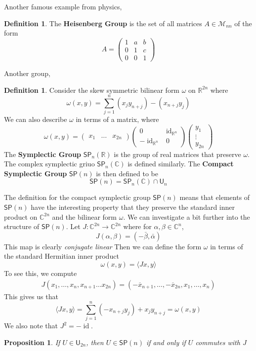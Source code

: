 \documentclass[psamsfonts]{amsart}
\newtheorem{prop}[thm]{Proposition}
\theoremstyle{definition}
\newtheorem{defn}[thm]{Definition}
\theoremstyle{remark}
\newcommand{\R}{\mathbb{R}}
\newcommand{\C}{\mathbb{C}}
\newcommand{\SP}{\mathsf{SP}}
\DeclareMathOperator{\id}{id}
\begin{document}
Another famous example from physics,
\begin{defn}
The \textbf{Heisenberg Group} is the set of all matrices $A \in \mathcal{M}_{nn}$ of the form
$$A = \begin{pmatrix}
1 & a & b \\
0 & 1 & c \\
0 & 0 & 1
\end{pmatrix} $$
\end{defn}

Another group,
\begin{defn}
Consider the skew symmetric bilinear form $\omega$ on $\R^{2n}$ where
$$\omega(x,y) = \sum_{j = 1}^n (x_jy_{n+j}) - (x_{n+j}y_{j}) $$
We can also describe $\omega$ in terms of a matrix, where
$$\omega(x,y) = \begin{pmatrix}
x_1 & \ldots  & x_{2n}
\end{pmatrix} \begin{pmatrix}
0 & \id_{\R^n} \\
-\id_{\R^n} & 0
\end{pmatrix} \begin{pmatrix}
y_1 \\
\vdots \\
y_{2n}
\end{pmatrix}$$
The \textbf{Symplectic Group} $\SP_n(\R)$ is the group of real matrices that preserve $\omega$. The complex symplectic griuo $\SP_n(\C)$ is defined similarly. The \textbf{Compact Symplectic Group} $\SP(n)$ is then defined to be 
$$\SP(n) = \SP_n(\C) \cap \mathsf{U}_n $$
\end{defn}

The definition for the compact symplectic group $\SP(n)$ means that elements of $\SP(n)$ have the interesting property that they preserve the standard inner product on $\C^{2n}$ and the bilinear form $\omega$. We can investigate a bit further into the structure of $\SP(n)$. Let $J: \C^{2n} \to \C^{2n}$ where for $\alpha,\beta \in \C^n$,
$$J(\alpha,\beta) = (-\bar{\beta}, \bar{\alpha}) $$
This map is clearly \emph{conjugate linear} Then we can define the form $\omega$ in terms of the standard Hermitian inner product 
$$\omega(x,y) = \langle Jx, y \rangle $$
To see this, we compute
\begin{align*}
J(x_1, \ldots, x_n, x_{n+1} \ldots x_{2n}) = (-\overline{x}_{n+1}, \ldots , -\overline{x}_{2n},x_1, \ldots, x_n)
\end{align*}
This gives us that 
$$\langle Jx,y \rangle = \sum_{j = 1}^n (-x_{n+j}y_j) + x_jy_{n+j} = \omega(x,y)  $$
We also note that $J^2 = -\id$. 
\begin{prop}
If $U \in \mathsf{U}_{2n}$, then $U \in \SP(n)$ if and only if $U$ commutes with $J$
\end{prop}
\end{document}
